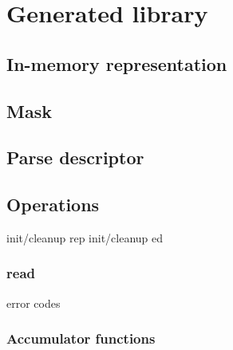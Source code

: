 \section{Generated library}
\subsection{In-memory representation}
\label{sec:arrays-rep}
\subsection{Mask}
\label{sec:arrays-masks}
\subsection{Parse descriptor}
\label{sec:arrays-parse-descriptors}
\subsection{Operations}
init/cleanup rep
init/cleanup ed
\subsubsection{read}
  error codes
\subsubsection{Accumulator functions}


